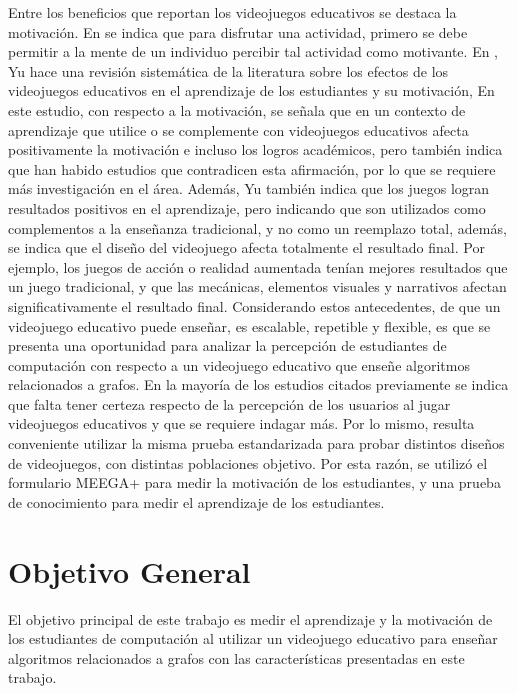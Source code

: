 Entre los beneficios que reportan los videojuegos educativos se destaca la motivación. En \cite{Bisson1996FunInLEarningPedagogicalRole} se indica
que para disfrutar una actividad, primero se debe permitir a la mente de un individuo percibir tal actividad como motivante. 
En \cite{Yu2020TheEffectsOfEducationGames}, Yu hace una revisión sistemática de la literatura sobre los efectos de los videojuegos educativos en el aprendizaje de los estudiantes y su motivación,
En este estudio, con respecto a la motivación, se señala que en un contexto de aprendizaje que utilice o se complemente con videojuegos educativos afecta positivamente 
la motivación e incluso los logros académicos, pero también indica que han habido estudios que contradicen esta afirmación, por lo que se requiere más investigación en el área.
Además, Yu también indica que los juegos logran resultados positivos en el aprendizaje, pero indicando que son utilizados como complementos a la enseñanza tradicional, y no como un reemplazo total,
además, se indica que el diseño del videojuego afecta totalmente el resultado final. Por ejemplo, los juegos de acción o realidad aumentada tenían mejores resultados que un
juego tradicional, y que las mecánicas, elementos visuales y narrativos afectan significativamente el resultado final.
Considerando estos antecedentes, de que un videojuego educativo puede enseñar, es escalable, repetible y flexible, es que se presenta una oportunidad para analizar la percepción
de estudiantes de computación con respecto a un videojuego educativo que enseñe algoritmos relacionados a grafos.
En la mayoría de los estudios citados previamente se indica que falta tener certeza respecto de la percepción de los usuarios al jugar videojuegos educativos y que 
se requiere indagar más. Por lo mismo, resulta conveniente utilizar la misma prueba estandarizada para probar distintos diseños de videojuegos,
con distintas poblaciones objetivo. Por esta razón, se utilizó el formulario MEEGA+ para medir la motivación de los estudiantes, y una prueba de conocimiento para 
medir el aprendizaje de los estudiantes.


\section{Objetivo General}

El objetivo principal de este trabajo es medir el aprendizaje y la motivación de los estudiantes de computación al 
utilizar un videojuego educativo para enseñar algoritmos relacionados a grafos con las características presentadas en este trabajo.

